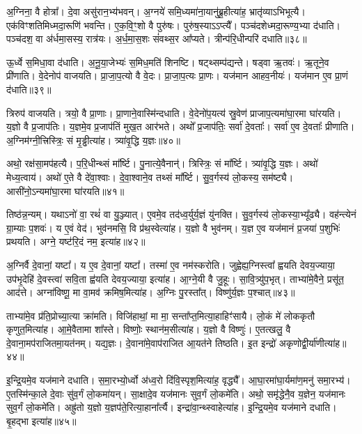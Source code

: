 अ॒ग्निना॒ वै होत्रा᳚।
दे॒वा असु॑रान॒भ्य॑भवन्।
अ॒ग्नये॑ समि॒ध्यमा॑ना॒यानु॑ब्रू॒हीत्या॑ह॒ भ्रातृ॑व्याऽभिभूत्यै।
एक॑विꣳशति\-मिध्मदा॒रूणि॑ भवन्ति।
ए॒क॒वि॒ꣳ॒शो वै पुरु॑षः।
पुरु॑ष॒स्याऽऽप्त्यै᳚।
पञ्च॑दशेध्म\-दा॒रूण्य॒भ्या द॑धाति।
पञ्च॑दश॒ वा अ॑र्धमा॒सस्य॒ रात्र॑यः।
अ॒र्ध॒मा॒स॒शः सं॑वथ्स॒र आ᳚प्यते।
त्रीन्प॑रि॒धीन्परि॑ दधाति॥३८॥\ip

ऊ॒र्ध्वे स॒मिधा॒वा द॑धाति।
अ॒नू॒या॒जेभ्यः॑ स॒मिध॒मति॑ शिनष्टि।
षट्थ्सम्प॑द्यन्ते।
षड्वा ऋ॒तवः॑।
ऋ॒तूने॒व प्री॑णाति।
वे॒देनोप॑ वाजयति।
प्रा॒जा॒प॒त्यो वै वे॒दः।
प्रा॒जा॒प॒त्यः प्रा॒णः।
यज॑मान आहव॒नीयः॑।
यज॑मान ए॒व प्रा॒णं द॑धाति॥३९॥\ip

त्रिरुप॑ वाजयति।
त्रयो॒ वै प्रा॒णाः।
प्रा॒णाने॒वास्मि॑न्दधाति।
वे॒देनो॑प॒यत्य॑ स्रु॒वेण॑ प्राजाप॒त्यमा॑घा॒रमा घा॑रयति।
य॒ज्ञो वै प्र॒जा\-प॑तिः।
य॒ज्ञमे॒व प्र॒जा\-प॑तिं मुख॒त आर॑भते।
अथो᳚ प्र॒जा\-प॑तिः॒ सर्वा॑ दे॒वताः᳚।
सर्वा॑ ए॒व दे॒वताः᳚ प्रीणाति।
अ॒ग्निम॑ग्नी॒त्त्रिस्त्रिः॒ सं मृ॒ड्ढीत्या॑ह।
त्र्या॑वृ॒द्धि य॒ज्ञः॥४०॥\ip

अथो॒ रक्ष॑सा॒मप॑हत्यै।
प॒रि॒धीन्थ्सं मा᳚र्ष्टि।
पु॒नात्ये॒वैनान्॑।
त्रिस्त्रिः॒ सं मा᳚र्ष्टि।
त्र्या॑वृ॒द्धि य॒ज्ञः।
अथो॑ मेध्य॒त्वाय॑।
अथो॑ ए॒ते वै दे॑वा॒श्वाः।
दे॒वा॒श्वाने॒व तथ्सं मा᳚र्ष्टि।
सु॒व॒र्गस्य॑ लो॒कस्य॒ सम॑ष्ट्यै।
आसी॑नो॒\-ऽन्यमा॑घा॒रमा घा॑रयति॥४१॥\ip

तिष्ठ॑न्न॒न्यम्।
यथाऽनो॑ वा॒ रथं॑ वा यु॒ञ्ज्यात्।
ए॒वमे॒व तद॑ध्व॒र्युर्य॒ज्ञं यु॑नक्ति।
सु॒व॒र्गस्य॑ लो॒कस्या॒भ्यू᳚ढ्यै।
वह॑न्त्येनं ग्रा॒म्याः प॒शवः॑।
य ए॒वं वेद॑।
भुव॑नमसि॒ वि प्र॑थ॒स्वेत्या॑ह।
य॒ज्ञो वै भुव॑नम्।
य॒ज्ञ ए॒व यज॑मानं प्र॒जया॑ प॒शुभिः॑ प्रथयति।
अग्ने॒ यष्ट॑रि॒दं नम॒ इत्या॑ह॥४२॥\ip

अ॒ग्निर्वै दे॒वानां॒ यष्टा᳚।
य ए॒व दे॒वानां॒ यष्टा᳚।
तस्मा॑ ए॒व नम॑स्करोति।
जुह्वेह्य॒ग्निस्त्वा᳚ ह्वयति देवय॒ज्याया॒ उप॑भृ॒देहि॑ दे॒वस्त्वा॑ सवि॒ता ह्व॑यति देवय॒ज्याया॒ इत्या॑ह।
आ॒ग्ने॒यी वै जु॒हूः।
सा॒वि॒त्र्यु॑प॒भृत्।
ताभ्या॑मे॒वैने॒ प्रसू॑त॒ आद॑त्ते।
अग्ना॑विष्णू॒ मा वा॒मव॑ क्रमिष॒मित्या॑ह।
अ॒ग्निः पु॒रस्ता᳚त्।
विष्णु॑र्य॒ज्ञः प॒श्चात्॥४३॥\ip

ताभ्या॑मे॒व प्र॑ति॒प्रोच्या॒त्या क्रा॑मति।
विजि॑हाथां॒ मा मा॒ सन्ता᳚प्त॒मित्या॒हाहिꣳ॑सायै।
लो॒कं मे॑ लोककृतौ कृणुत॒मित्या॑ह।
आ॒\-मे॒वैतामा शा᳚स्ते।
विष्णोः॒ स्थान॑म॒सीत्या॑ह।
य॒ज्ञो वै विष्णुः॑।
ए॒तत्खलु॒ वै दे॒वाना॒\-मप॑\-रा\-जित\-मा॒यत॑नम्।
यद्य॒ज्ञः।
दे॒वाना॑\-मे॒वा\-प॑रा\-जित आ॒यत॑ने तिष्ठति।
इ॒त इन्द्रो॑ अकृणोद्वी॒र्या॑\-णीत्या॑ह॥४४॥\ip

इ॒न्द्रि॒यमे॒व यज॑माने दधाति।
स॒मा॒रभ्यो॒र्ध्वो अ॑ध्व॒रो दि॑वि॒स्पृश॒मित्या॑ह॒ वृद्ध्यै᳚।
आ॒घा॒रमा॑घा॒र्यमा॑ण॒मनु॑ समा॒रभ्य॑।
ए॒तस्मि॑न्का॒ले दे॒वाः सु॑व॒र्गं लो॒कमा॑यन्।
सा॒क्षादे॒व यज॑मानः सुव॒र्गं लो॒कमे॑ति।
अथो॒ समृ॑द्धेनै॒व य॒ज्ञेन॒ यज॑मानः सुव॒र्गं लो॒कमे॑ति।
अह्रु॑तो य॒ज्ञो य॒ज्ञप॑ते॒रित्या॒हाना᳚र्त्यै।
इन्द्रा॑वा॒न्थ्स्वाहेत्या॑ह।
इ॒न्द्रि॒यमे॒व यज॑माने दधाति।
बृ॒हद्भा इत्या॑ह॥४५॥\ip

